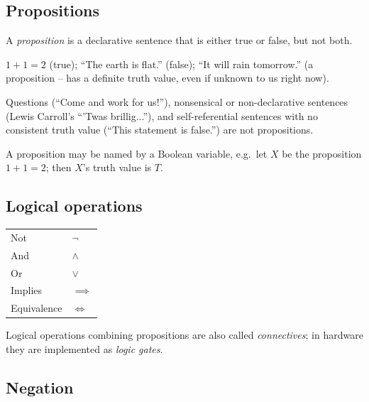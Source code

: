 \documentclass[11pt]{article}
\begin{document}
\subsection{Propositions}
\label{sec:4-3}

\begin{definition}
A \emph{proposition} is a declarative sentence that is either true or false, but not both.
\end{definition}

\begin{example}[Propositions]
$1+1=2$ (true); ``The earth is flat.'' (false); ``It will rain tomorrow.'' (a proposition -- has a definite truth value, even if unknown to us right now).
\end{example}

\begin{example}
Questions (``Come and work for us!''), nonsensical or non-declarative sentences (Lewis Carroll's ``'Twas brillig...''), and self-referential sentences with no consistent truth value (``This statement is false.'') are not propositions.
\end{example}

\begin{note}
A proposition may be named by a Boolean variable, e.g.\ let $X$ be the proposition $1+1=2$; then $X$'s truth value is $T$.
\end{note}

\subsection{Logical operations}
\label{sec:4-4}

\begin{note}
\begin{center}
\begin{tabular}{ll}
Not & $\neg$ \\
And & $\wedge$ \\
Or & $\vee$ \\
Implies & $\implies$ \\
Equivalence & $\iff$
\end{tabular}
\end{center}
Logical operations combining propositions are also called \emph{connectives}; in hardware they are implemented as \emph{logic gates}.
\end{note}

\subsection{Negation}
\label{sec:4-5}
\end{document}
